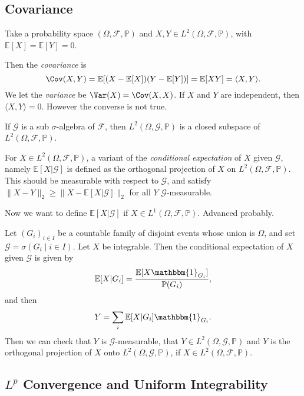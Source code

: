 \documentclass[12pt]{article}
\begin{document}
\subsection{Covariance}
\label{sub:cov}

Take a probability space $(\Omega, \mathcal{F}, \mathbb{P})$ and $X, Y \in L^2(\Omega, \mathcal{F}, \mathbb{P})$, with $\mathbb{E}[X] = \mathbb{E}[Y] = 0$.

Then the \emph{covariance} is 
\[
\Cov(X, Y) = \mathbb{E}[(X- \mathbb{E}[X])(Y-\mathbb{E}[Y])] = \mathbb{E}[XY] = \langle X, Y \rangle.
\]
We let the \emph{variance} be $\Var(X) = \Cov(X,X)$. If $X$ and $Y$ are independent, then $\langle X, Y\rangle = 0$. However the converse is not true.

If $\mathcal{G}$ is a sub $\sigma$-algebra of $\mathcal{F}$, then $L^2(\Omega, \mathcal{G}, \mathbb{P})$ is a closed subspace of $L^2(\Omega, \mathcal{F}, \mathbb{P})$.

For $X \in L^2(\Omega, \mathcal{F}, \mathbb{P})$, a variant of the \emph{conditional expectation} of $X$ given $\mathcal{G}$, namely $\mathbb{E}[X|\mathcal{G}]$ is defined as the orthogonal projection of $X$ on $L^2(\Omega, \mathcal{F}, \mathbb{P})$. This should be measurable with respect to $\mathcal{G}$, and satisfy $\|X - Y\|_2 \geq \|X-\mathbb{E}[X|\mathcal{G}]\|_2$ for all $Y$ $\mathcal{G}$-measurable.

Now we want to define $\mathbb{E}[X|\mathcal{G}]$ if $X \in L^1(\Omega, \mathcal{F}, \mathbb{P})$. Advanced probably.

Let $(G_i)_{i \in I}$ be a countable family of disjoint events whose union is $\Omega$, and set $\mathcal{G} = \sigma(G_i \mid i \in I)$. Let $X$ be integrable. Then the conditional expectation of $X$ given $\mathcal{G}$ is given by
\[
\mathbb{E}[X|G_i] = \frac{\mathbb{E}[X \mathbbm{1}_{G_i}]}{\mathbb{P}(G_i)},
\]
and then
\[
Y = \sum_i \mathbb{E}[X|G_i] \mathbbm{1}_{G_i}.
\]
Then we can check that $Y$ is $\mathcal{G}$-measurable, that $Y \in L^2(\Omega, \mathcal{G}, \mathbb{P})$ and $Y$ is the orthogonal projection of $X$ onto $L^2(\Omega, \mathcal{G}, \mathbb{P})$, if $X \in L^2(\Omega, \mathcal{F}, \mathbb{P})$.

\subsection{\texorpdfstring{$L^p$}{L\^p} Convergence and Uniform Integrability}
\label{sub:lp_conv}
\end{document}
